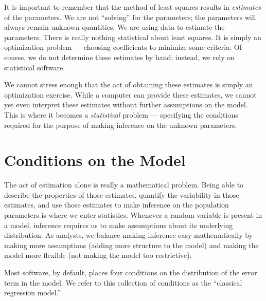 \documentclass[
  letterpaper,
  DIV=11,
  numbers=noendperiod]{scrreprt}
\theoremstyle{definition}
\theoremstyle{definition}
\theoremstyle{remark}
\begin{document}
It is important to remember that the method of least squares results in
\emph{estimates} of the parameters. We are not ``solving'' for the
parameters; the parameters will always remain unknown quantities. We are
using data to estimate the parameters. There is really nothing
statistical about least squares. It is simply an optimization problem
--- choosing coefficients to minimize some criteria. Of course, we do
not determine these estimates by hand; instead, we rely on statistical
software.

We cannot stress enough that the act of obtaining these estimates is
simply an optimization exercise. While a computer can provide these
estimates, we cannot yet even interpret these estimates without further
assumptions on the model. This is where it becomes a \emph{statistical}
problem --- specifying the conditions required for the purpose of making
inference on the unknown parameters.

\hypertarget{conditions-on-the-model}{%
\section{Conditions on the Model}\label{conditions-on-the-model}}

The act of estimation alone is really a mathematical problem. Being able
to describe the properties of those estimates, quantify the variability
in those estimates, and use those estimates to make inference on the
population parameters is where we enter statistics. Whenever a random
variable is present in a model, inference requires us to make
assumptions about its underlying distribution. As analysts, we balance
making inference easy mathematically by making more assumptions (adding
more structure to the model) and making the model more flexible (not
making the model too restrictive).

Most software, by default, places four conditions on the distribution of
the error term in the model. We refer to this collection of conditions
as the ``classical regression model.''
\end{document}
